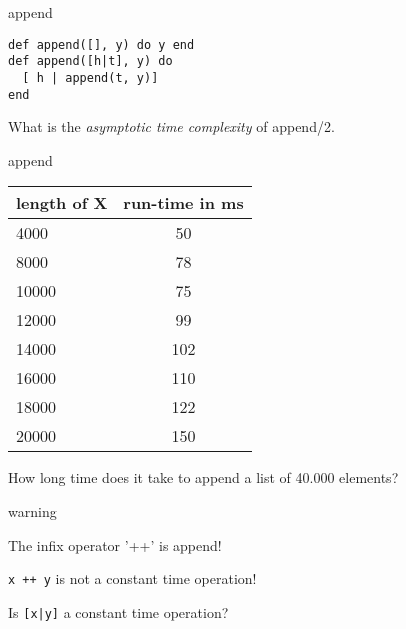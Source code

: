 \begin{frame}[fragile]{append}

\begin{verbatim}
def append([], y) do y end
def append([h|t], y) do 
  [ h | append(t, y)] 
end
\end{verbatim}

\pause\vspace{20pt} What is the {\em asymptotic time complexity} of append/2.
\end{frame}


\begin{frame}{append}

\begin{tabular}{|l|c|}
\hline
length of X & run-time in ms\\
\hline
  4000  &     50 \\
  8000  &     78 \\
 10000  &     75 \\
 12000  &     99 \\
 14000  &    102 \\
 16000  &    110 \\
 18000  &    122 \\
 20000  &    150 \\
\hline
\end{tabular}

\pause \vspace{20pt}How long time does it take to append a list of 40.000 elements?

\end{frame}

\begin{frame}{warning}

\pause The infix operator '++' is append! 

\pause\vspace{20pt} {\tt x ++ y} is not a constant time operation!

\pause\vspace{20pt} Is {\tt [x|y]} a constant time operation?

\end{frame}

